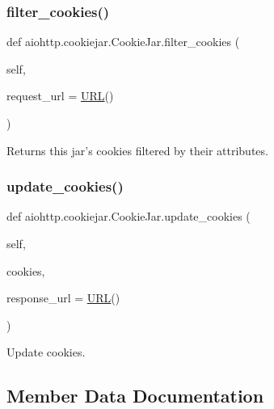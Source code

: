 \subsubsection{\texorpdfstring{filter\+\_\+cookies()}{filter\_cookies()}}
{\footnotesize\ttfamily def aiohttp.\+cookiejar.\+Cookie\+Jar.\+filter\+\_\+cookies (\begin{DoxyParamCaption}\item[{}]{self,  }\item[{}]{request\+\_\+url = {\ttfamily \hyperlink{classyarl_1_1_u_r_l}{U\+RL}()} }\end{DoxyParamCaption})}

\begin{DoxyVerb}Returns this jar's cookies filtered by their attributes.\end{DoxyVerb}
 \mbox{\label{classaiohttp_1_1cookiejar_1_1_cookie_jar_a98a3d64c7985022211dc300a2a46df73}} 
\subsubsection{\texorpdfstring{update\+\_\+cookies()}{update\_cookies()}}
{\footnotesize\ttfamily def aiohttp.\+cookiejar.\+Cookie\+Jar.\+update\+\_\+cookies (\begin{DoxyParamCaption}\item[{}]{self,  }\item[{}]{cookies,  }\item[{}]{response\+\_\+url = {\ttfamily \hyperlink{classyarl_1_1_u_r_l}{U\+RL}()} }\end{DoxyParamCaption})}

\begin{DoxyVerb}Update cookies.\end{DoxyVerb}
 

\subsection{Member Data Documentation}
\mbox{\label{classaiohttp_1_1cookiejar_1_1_cookie_jar_aa6516632e247dac08a6b1f5e7c1cfc44}} 
